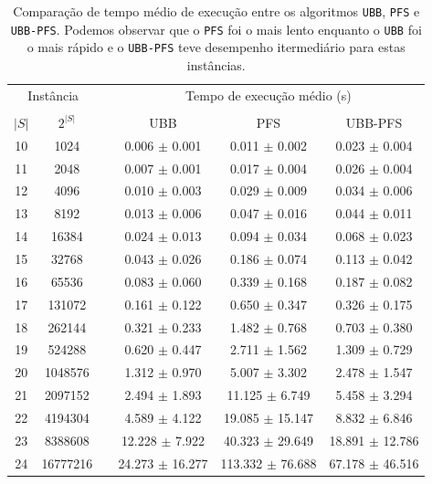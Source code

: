 \documentclass[12pt]{article}
\newcommand{\algname}[1]{\texttt{#1}}
\begin{document}
\begin{table}
\centering
\footnotesize
\caption{Comparação de tempo médio de execução entre os algoritmos
\algname{UBB}, \algname{PFS} e \algname{UBB-PFS}. Podemos observar que
o \algname{PFS} foi o mais lento enquanto o \algname{UBB} foi o mais
rápido e o \algname{UBB-PFS} teve desempenho itermediário para estas
instâncias.}
\label{tab:ubbpfs_vs_ubb_vs_pfs_time}
\begin{tabular}{cc c ccc}
\toprule
\multicolumn{2}{c}{Instância} & \phantom{} & \multicolumn{3}{c}{Tempo de execução médio (s)}\\
\cline{1-2}\cline{4-6}\\
$|S|$ & $2^{|S|}$ && UBB & PFS & UBB-PFS  \\
10 &    1024 &&  0.006 $\pm$ 0.001 & 0.011 $\pm$ 0.002 & 0.023 $\pm$ 0.004 \\
11 &    2048 &&  0.007 $\pm$ 0.001 & 0.017 $\pm$ 0.004 & 0.026 $\pm$ 0.004 \\
12 &    4096 &&  0.010 $\pm$ 0.003 & 0.029 $\pm$ 0.009 & 0.034 $\pm$ 0.006 \\
13 &    8192 &&  0.013 $\pm$ 0.006 & 0.047 $\pm$ 0.016 & 0.044 $\pm$ 0.011 \\
14 &   16384 &&  0.024 $\pm$ 0.013 & 0.094 $\pm$ 0.034 & 0.068 $\pm$ 0.023 \\
15 &   32768 &&  0.043 $\pm$ 0.026 & 0.186 $\pm$ 0.074 & 0.113 $\pm$ 0.042 \\
16 &   65536 &&  0.083 $\pm$ 0.060 & 0.339 $\pm$ 0.168 & 0.187 $\pm$ 0.082 \\
17 &  131072 &&  0.161 $\pm$ 0.122 & 0.650 $\pm$ 0.347 & 0.326 $\pm$ 0.175 \\
18 &  262144 &&  0.321 $\pm$ 0.233 & 1.482 $\pm$ 0.768 & 0.703 $\pm$ 0.380 \\
19 &  524288 &&  0.620 $\pm$ 0.447 & 2.711 $\pm$ 1.562 & 1.309 $\pm$ 0.729 \\
20 & 1048576 &&  1.312 $\pm$ 0.970 & 5.007 $\pm$ 3.302 & 2.478 $\pm$ 1.547 \\
21 & 2097152 &&  2.494 $\pm$ 1.893 & 11.125 $\pm$ 6.749 & 5.458 $\pm$ 3.294 \\
22 & 4194304 &&  4.589 $\pm$ 4.122 & 19.085 $\pm$ 15.147 & 8.832 $\pm$ 6.846 \\
23 & 8388608 &&  12.228 $\pm$ 7.922 & 40.323 $\pm$ 29.649 & 18.891 $\pm$ 12.786 \\
24 & 16777216 &&  24.273 $\pm$ 16.277 & 113.332 $\pm$ 76.688 & 67.178 $\pm$ 46.516 \\
\bottomrule
\end{tabular}
\end{table}
\end{document}
